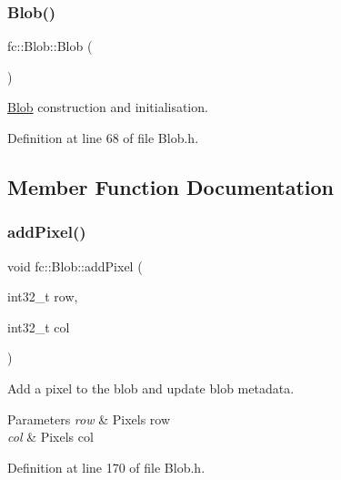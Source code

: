 \subsubsection{\texorpdfstring{Blob()}{Blob()}}
{\footnotesize\ttfamily fc\+::\+Blob\+::\+Blob (\begin{DoxyParamCaption}{ }\end{DoxyParamCaption})\hspace{0.3cm}{\ttfamily [inline]}}



\hyperlink{classfc_1_1Blob}{Blob} construction and initialisation. 



Definition at line 68 of file Blob.\+h.



\subsection{Member Function Documentation}
\mbox{\label{classfc_1_1Blob_a01be7313665ad198c73220165a008f2b}} 
\subsubsection{\texorpdfstring{add\+Pixel()}{addPixel()}}
{\footnotesize\ttfamily void fc\+::\+Blob\+::add\+Pixel (\begin{DoxyParamCaption}\item[{int32\+\_\+t}]{row,  }\item[{int32\+\_\+t}]{col }\end{DoxyParamCaption})\hspace{0.3cm}{\ttfamily [inline]}}



Add a pixel to the blob and update blob metadata. 


\begin{DoxyParams}{Parameters}
{\em row} & Pixel\textquotesingle{}s row \\
\hline
{\em col} & Pixel\textquotesingle{}s col \\
\hline
\end{DoxyParams}


Definition at line 170 of file Blob.\+h.

